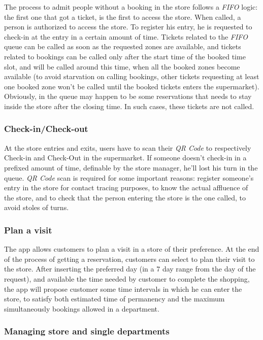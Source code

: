 \documentclass{article}
\begin{document}
		The process to admit people without a booking in the store follows a \emph{FIFO} logic: the first one that got a ticket, is the first to access the store. When called, a person is authorized to access the store. To register his entry, he is requested to check-in at the entry in a certain amount of time. Tickets related to the \emph{FIFO} queue can be called as soon as the requested zones are available, and tickets related to bookings can be called only after the start time of the booked time slot, and will be called around this time, when all the booked zones become available (to avoid starvation on calling bookings, other tickets requesting at least one booked zone won't be called until the booked tickets enters the supermarket). Obviously, in the queue may happen to be some reservations that needs to stay inside the store after the closing time. In such cases, these tickets are not called.
		
		\subsubsection{Check-in/Check-out}
		
		At the store entries and exits, users have to scan their \emph{QR Code} to respectively Check-in and Check-Out in the supermarket. If someone doesn't check-in in a prefixed amount of time, definable by the store manager, he'll lost his turn in the queue. \emph{QR Code} scan is required for some important reasons: register someone's entry in the store for contact tracing purposes, to know the actual affluence of the store, and to check that the person entering the store is the one called, to avoid stoles of turns.
		
		\subsubsection{Plan a visit}
		
		The app allows customers to plan a visit in a store of their preference. At the end of the process of getting a reservation, customers can select to plan their visit to the store. After inserting the preferred day (in a 7 day range from the day of the request), and available the time needed by customer to complete the shopping, the app will propose customer some time intervals in which he can enter the store, to satisfy both estimated time of permanency and the maximum simultaneously bookings allowed in a department. 
		
		\subsubsection{Managing store and single departments}
		
\end{document}
